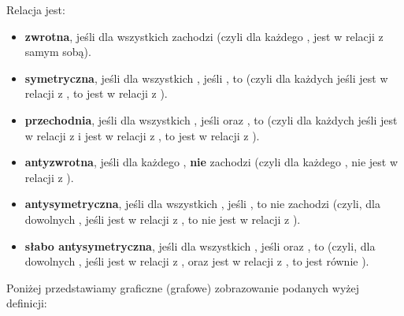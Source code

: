 \begin{definition}
Relacja  jest:
\begin{itemize}
    \item \textbf{zwrotna}, jeśli dla wszystkich  zachodzi  (czyli dla każdego ,  jest w relacji z samym sobą).
    \item \textbf{symetryczna}, jeśli dla wszystkich , jeśli , to  (czyli dla każdych  jeśli  jest w relacji z , to  jest w relacji z ).
    \item \textbf{przechodnia}, jeśli dla wszystkich , jeśli  oraz , to  (czyli dla każdych  jeśli  jest w relacji z  i  jest w relacji z , to  jest w relacji z ).
    \item \textbf{antyzwrotna}, jeśli dla każdego , \textbf{nie} zachodzi  (czyli dla każdego ,  nie jest w relacji z ).
    \item \textbf{antysymetryczna}, jeśli dla wszystkich , jeśli , to nie zachodzi  (czyli, dla dowolnych , jeśli  jest w relacji z , to  nie jest w relacji z ).
    \item \textbf{słabo antysymetryczna}, jeśli dla wszystkich , jeśli  oraz , to  (czyli, dla dowolnych , jeśli  jest w relacji z , oraz  jest w relacji z , to  jest równie ).
\end{itemize}
\end{definition}

Poniżej przedstawiamy graficzne (grafowe) zobrazowanie podanych wyżej definicji:

